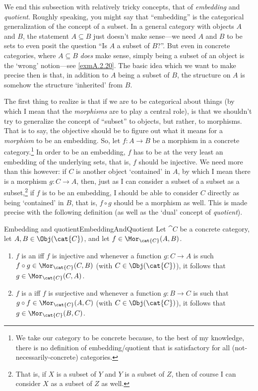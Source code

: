 We end this subsection with relatively tricky concepts, that of \emph{embedding} and \emph{quotient}.  Roughly speaking, you might say that ``embedding'' is the categorical generalization of the concept of a subset.  In a general category with objects $A$ and $B$, the statement $A\subseteq B$ just doesn't make sense---we need $A$ and $B$ to be sets to even posit the question ``Is $A$ a subset of $B$?''.  But even in concrete categories, where $A\subseteq B$ \emph{does} make sense, simply being a subset of an object is the `wrong' notion---see \cref{exmA.2.20}.  The basic idea which we want to make precise then is that, in addition to $A$ being a subset of $B$, the structure on $A$ is somehow the structure `inherited' from $B$.

The first thing to realize is that if we are to be categorical about things (by which I mean that the \emph{morphisms} are to play a central role), is that we shouldn't try to generalize the concept of ``subset'' to objects, but rather, to morphisms.  That is to say, the objective should be to figure out what it means for a \emph{morphism} to be an embedding.  So, let $f\colon A\rightarrow B$ be a morphism in a concrete category.\footnote{We take our category to be concrete because, to the best of my knowledge, there is no definition of embedding/quotient that is satisfactory for all (not-necessarily-concrete) categories.}  In order to be an embedding, $f$ has to be at the very least an embedding of the underlying sets, that is, $f$ should be injective.  We need more than this however:  if $C$ is another object `contained' in $A$, by which I mean there is a morphism $g\colon C\rightarrow A$, then, just as I can consider a subset of a subset as a subset,\footnote{That is, if $X$ is a subset of $Y$ and $Y$ is a subset of $Z$, then of course I can consider $X$ as a subset of $Z$ as well.} if $f$ is to be an embedding, I should be able to consider $C$ directly as being `contained' in $B$, that is, $f\circ g$ should be a morphism as well.  This is made precise with the following definition (as well as the `dual' concept of \emph{quotient}).
\begin{dfn}{Embedding and quotient}{EmbeddingAndQuotient}
Let $\cat{C}$ be a concrete category, let $A,B\in \Obj (\cat{C})$, and let $f\in \Mor _{\cat{C}}(A,B)$.
\begin{enumerate}
\item $f$ is an  iff $f$ is injective and whenever a function $g\colon C\rightarrow A$ is such $f\circ g\in \Mor _{\cat{C}}(C,B)$ (with $C\in \Obj (\cat{C})$), it follows that $g\in \Mor _{\cat{C}}(C,A)$.
\item $f$ is a  iff $f$ is surjective and whenever a function $g\colon B\rightarrow C$ is such that $g\circ f\in \Mor _{\cat{C}}(A,C)$ (with $C\in \Obj (\cat{C})$), it follows that $g\in \Mor _{\cat{C}}(B,C)$.
\end{enumerate}
\end{dfn}
